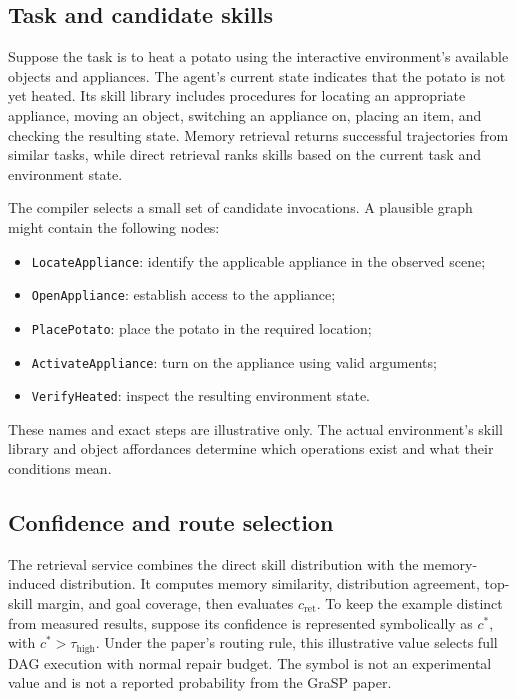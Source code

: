 \subsection{Task and candidate skills}

Suppose the task is to heat a potato using the interactive environment's available objects and appliances. The agent's current state indicates that the potato is not yet heated. Its skill library includes procedures for locating an appropriate appliance, moving an object, switching an appliance on, placing an item, and checking the resulting state. Memory retrieval returns successful trajectories from similar tasks, while direct retrieval ranks skills based on the current task and environment state.

The compiler selects a small set of candidate invocations. A plausible graph might contain the following nodes:

\begin{itemize}
  \item \texttt{LocateAppliance}: identify the applicable appliance in the observed scene;
  \item \texttt{OpenAppliance}: establish access to the appliance;
  \item \texttt{PlacePotato}: place the potato in the required location;
  \item \texttt{ActivateAppliance}: turn on the appliance using valid arguments;
  \item \texttt{VerifyHeated}: inspect the resulting environment state.
\end{itemize}

These names and exact steps are illustrative only. The actual environment's skill library and object affordances determine which operations exist and what their conditions mean.

\subsection{Confidence and route selection}

The retrieval service combines the direct skill distribution with the memory-induced distribution. It computes memory similarity, distribution agreement, top-skill margin, and goal coverage, then evaluates \(c_{\mathrm{ret}}\). To keep the example distinct from measured results, suppose its confidence is represented symbolically as \(c^*\), with \(c^*>\tau_{\mathrm{high}}\). Under the paper's routing rule, this illustrative value selects full DAG execution with normal repair budget. The symbol is not an experimental value and is not a reported probability from the GraSP paper.

